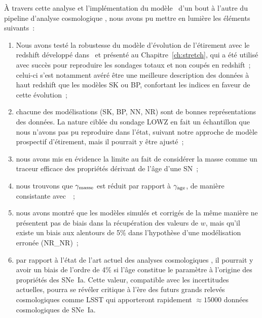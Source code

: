 \documentclass[../main/main.tex]{subfiles}
\begin{document}
À travers cette analyse et l'implémentation du modèle~
d'un bout à l'autre du pipeline d'analyse cosmologique \snana, nous
avons pu mettre en lumière les éléments suivants~:
\begin{enumerate}
    \item Nous avons testé la robustesse du modèle d'évolution de l'étirement
        avec le redshift développé dans~\cite{nicolas2021} et présenté au
        Chapitre~\ref{ch:stretch}, qui a été utilisé avec succès pour reproduire
        les sondages totaux et non coupés en redshift~; celui-ci s'est notamment
        avéré être une meilleure description des données à haut redshift que les
        modèles SK ou BP, confortant les indices en faveur de cette évolution~;
    \item chacune des modélisations (SK, BP, NN, NR) sont de bonnes
        représentations des données. La nature ciblée du sondage LOWZ en fait
        un échantillon que nous n'avons pas pu reproduire dans l'état, suivant
        notre approche de modèle prospectif d'étirement, mais il pourrait y être
        ajusté~;
    \item nous avons mis en évidence la limite au fait de considérer la masse
        comme un traceur efficace des propriétés dérivant de l'âge d'une SN~;
    \item nous trouvons que $\gamma_{\rm masse}$ est réduit par rapport à
        $\gamma_{\rm age}$, de manière consistante avec~\cite{briday2022}~;
    \item nous avons montré que les modèles simulés et corrigés de la même
        manière ne présentent pas de biais dans la récupération des valeurs de
        $w$, mais qu'il existe un biais aux alentours de 5\% dans l'hypothèse
        d'une modélisation erronée (NR\_NR)~;
    \item par rapport à l'état de l'art actuel des analyses cosmologiques
        , il pourrait y avoir un biais de l'ordre de
        4\% si l'âge constitue le paramètre à l'origine des propriétés des
        SNe~Ia. Cette valeur, compatible avec les incertitudes actuelles, pourra
        se révéler critique à l'ère des futurs grands relevés cosmologiques
        comme LSST qui apporteront rapidement $\approx \num{15000}$ données
        cosmologiques de SNe~Ia.
\end{enumerate}
\end{document}
